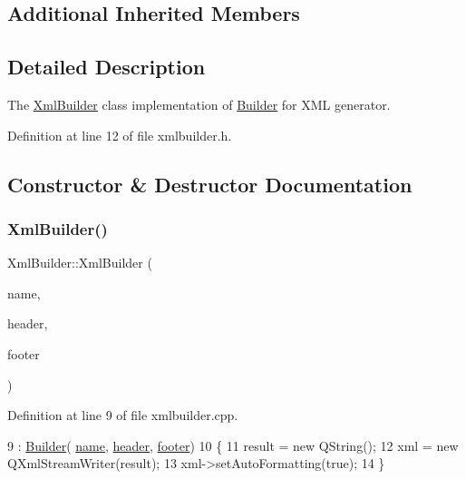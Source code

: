 \subsection*{Additional Inherited Members}


\subsection{Detailed Description}
The \hyperlink{class_xml_builder}{Xml\+Builder} class implementation of \hyperlink{class_builder}{Builder} for X\+ML generator. 

Definition at line 12 of file xmlbuilder.\+h.



\subsection{Constructor \& Destructor Documentation}
\mbox{\label{class_xml_builder_affc2a88fc3eaefab78f1142cc2756aad}} 
\subsubsection{\texorpdfstring{Xml\+Builder()}{XmlBuilder()}}
{\footnotesize\ttfamily Xml\+Builder\+::\+Xml\+Builder (\begin{DoxyParamCaption}\item[{Q\+String}]{name,  }\item[{Q\+String}]{header,  }\item[{Q\+String}]{footer }\end{DoxyParamCaption})}



Definition at line 9 of file xmlbuilder.\+cpp.


\begin{DoxyCode}
9                                                                    : \hyperlink{class_builder_a90a875243096a42ca4069258c52a1ad4}{Builder}(
      \hyperlink{class_builder_ad8ac906f8ce85ebcd061c4ee8e6f6a01}{name}, \hyperlink{class_builder_ae3800e384b079c2d66ab4d8f98cbb4ad}{header}, \hyperlink{class_builder_a5ace791b99eb11341d6f39e35fdd2ce7}{footer})
10 \{
11     result = \textcolor{keyword}{new} QString();
12     xml = \textcolor{keyword}{new} QXmlStreamWriter(result);
13     xml->setAutoFormatting(\textcolor{keyword}{true});
14 \}
\end{DoxyCode}


